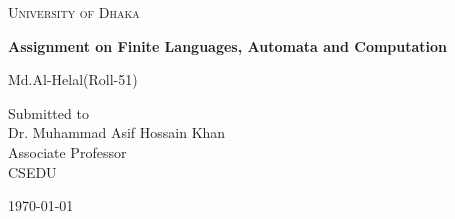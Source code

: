 \documentclass[12pt,a4paper]{report}
\begin{document}
\begin{titlepage}
\centering
{\scshape\LARGE University of Dhaka \par}
\vspace{3.3cm}
{\huge\bfseries Assignment on Finite Languages, Automata and Computation\par}
\vspace{2cm}
{\Large Md.Al-Helal(Roll-51)\par}
\vfill
Submitted to \\
\vspace{0.5cm}
{Dr. Muhammad Asif Hossain Khan}\\ Associate Professor\\CSEDU
\vfill
{\large \today\par}
\end{titlepage}
\end{document}
